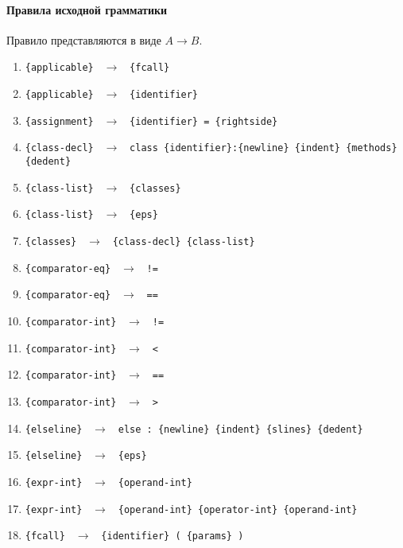 \documentclass[a4paper,10pt,notitlepage,pdftex]{scrreprt}
\begin{document}
        \paragraph{Правила исходной грамматики}
        \label{para:rules}
            Правило представляются в виде $A \rightarrow B$.
            \begin{enumerate}
                \item \verb'{applicable} ' $\rightarrow$ \verb' {fcall}'
                \item \verb'{applicable} ' $\rightarrow$ \verb' {identifier}'


                \item \verb'{assignment} ' $\rightarrow$ \verb' {identifier} = {rightside}'
                \item \verb'{class-decl} ' $\rightarrow$ \verb' class {identifier}:{newline} {indent} {methods} {dedent}'
                \item \verb'{class-list} ' $\rightarrow$ \verb' {classes}'
                \item \verb'{class-list} ' $\rightarrow$ \verb' {eps}'
                \item \verb'{classes} ' $\rightarrow$ \verb' {class-decl} {class-list}'
                \item \verb'{comparator-eq} ' $\rightarrow$ \verb' !='
                \item \verb'{comparator-eq} ' $\rightarrow$ \verb' =='
                \item \verb'{comparator-int} ' $\rightarrow$ \verb' !='
                \item \verb'{comparator-int} ' $\rightarrow$ \verb' <'
                \item \verb'{comparator-int} ' $\rightarrow$ \verb' =='
                \item \verb'{comparator-int} ' $\rightarrow$ \verb' >'
                \item \verb'{elseline} ' $\rightarrow$ \verb' else : {newline} {indent} {slines} {dedent}'
                \item \verb'{elseline} ' $\rightarrow$ \verb' {eps}'
                \item \verb'{expr-int} ' $\rightarrow$ \verb' {operand-int}'
                \item \verb'{expr-int} ' $\rightarrow$ \verb' {operand-int} {operator-int} {operand-int}'
                \item \verb'{fcall} ' $\rightarrow$ \verb' {identifier} ( {params} )'

\end{enumerate}
\end{document}
